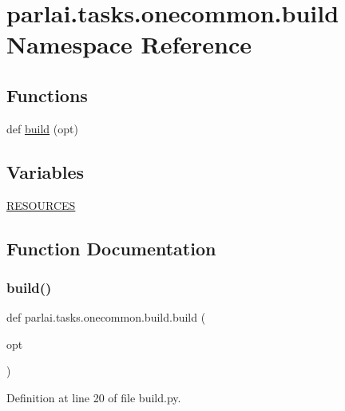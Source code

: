 \hypertarget{namespaceparlai_1_1tasks_1_1onecommon_1_1build}{}\section{parlai.\+tasks.\+onecommon.\+build Namespace Reference}
\label{namespaceparlai_1_1tasks_1_1onecommon_1_1build}
\subsection*{Functions}
\begin{DoxyCompactItemize}
\item 
def \hyperlink{namespaceparlai_1_1tasks_1_1onecommon_1_1build_a5346bc6e3ac1dc0813da2747f877c03b}{build} (opt)
\end{DoxyCompactItemize}
\subsection*{Variables}
\begin{DoxyCompactItemize}
\item 
\hyperlink{namespaceparlai_1_1tasks_1_1onecommon_1_1build_ac96c78cd9c65edd3fcdb7ac7c6ac5872}{R\+E\+S\+O\+U\+R\+C\+ES}
\end{DoxyCompactItemize}


\subsection{Function Documentation}
\mbox{\label{namespaceparlai_1_1tasks_1_1onecommon_1_1build_a5346bc6e3ac1dc0813da2747f877c03b}} 
\subsubsection{\texorpdfstring{build()}{build()}}
{\footnotesize\ttfamily def parlai.\+tasks.\+onecommon.\+build.\+build (\begin{DoxyParamCaption}\item[{}]{opt }\end{DoxyParamCaption})}



Definition at line 20 of file build.\+py.


